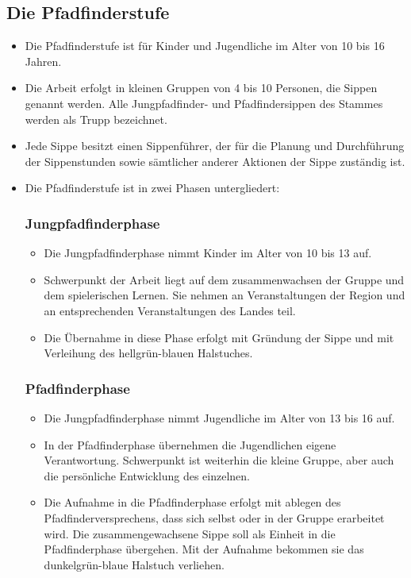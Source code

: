 \documentclass[a4paper]{article}
\begin{document}
    \subsection{Die Pfadfinderstufe} %
    \label{sub:die_pfadfinderstufe}
    \begin{itemize}
        \item Die Pfadfinderstufe ist für Kinder und Jugendliche im Alter von 10 bis 16 Jahren. 
        \item Die Arbeit erfolgt in kleinen Gruppen von 4 bis 10 Personen, die Sippen genannt werden. Alle Jungpfadfinder- und Pfadfindersippen des Stammes werden als Trupp bezeichnet.
        \item Jede Sippe besitzt einen Sippenführer, der für die Planung und Durchführung der Sippenstunden sowie sämtlicher anderer Aktionen der Sippe zuständig ist. 
        \item Die Pfadfinderstufe ist in zwei Phasen untergliedert:
        \subsubsection{Jungpfadfinderphase} %
        \label{ssub:jungpfadfinderphase}
            \begin{itemize}
                \item Die Jungpfadfinderphase nimmt Kinder im Alter von 10 bis 13 auf.
                \item Schwerpunkt der Arbeit liegt auf dem zusammenwachsen der Gruppe und dem spielerischen Lernen. Sie nehmen an Veranstaltungen der Region und an entsprechenden Veranstaltungen des Landes teil.
                \item Die Übernahme in diese Phase erfolgt mit Gründung der Sippe und mit Verleihung des hellgrün-blauen Halstuches.
            \end{itemize}
        \subsubsection{Pfadfinderphase} %
        \label{ssub:pfadfinderphase}
        \begin{itemize}
            \item Die Jungpfadfinderphase nimmt Jugendliche im Alter von 13 bis 16 auf.
            \item In der Pfadfinderphase übernehmen die Jugendlichen eigene Verantwortung. Schwerpunkt ist weiterhin die kleine Gruppe, aber auch die persönliche Entwicklung des einzelnen. 
            \item Die Aufnahme in die Pfadfinderphase erfolgt mit ablegen des Pfadfinderversprechens, dass sich selbst oder in der Gruppe erarbeitet wird. Die zusammengewachsene Sippe soll als Einheit in die Pfadfinderphase übergehen. Mit der Aufnahme bekommen sie das dunkelgrün-blaue Halstuch verliehen. 
        \end{itemize}
    \end{itemize}
    
\end{document}

